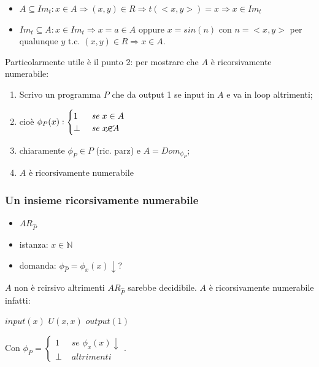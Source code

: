\documentclass{article}
\begin{document}
\begin{itemize}
	\item $A \subseteq Im_t: x \in A \Rightarrow (x,y) \in R \Rightarrow  t(<x,y>)=x \Rightarrow x \in Im_t$
	\item $Im_t \subseteq A:x \in Im_t \Rightarrow x=a \in A$ oppure $x=sin(n)$ con $n=<x,y>$ per qualunque $y$ t.c. $(x,y) \in R \Rightarrow x \in A$.
\end{itemize}




Particolarmente utile è il punto 2: per mostrare che $A$ è ricorsivamente numerabile:
\begin{enumerate}
	\item Scrivo un programma $P$ che da output 1 se input in $A$ e va in loop altrimenti;
	\item cioè $\phi_P(x):
		\begin{cases}
			1 &\textit{ se } x \in A\\
			\perp &\textit{ se } x \cancel{\in} A
		\end{cases}$
	\item chiaramente $\phi_P \in P$ (ric. parz) e $A=Dom_{\phi_P}$;
	\item $A$ è ricorsivamente numerabile
\end{enumerate}
   

\subsubsection{Un insieme ricorsivamente numerabile}
\begin{itemize}
	\item $AR_{\hat{P}}$
	\item istanza: $x \in \mathbb{N}$
	\item domanda: $\phi_{\hat{P}}=\phi_x(x)\downarrow$?
\end{itemize}
$A$ non è rcirsivo altrimenti $AR_{\hat{P}}$ sarebbe decidibile.
$A$ è ricorsivamente numerabile infatti:

\begin{algorithm}[h]
	\caption{$P \equiv$}
        \begin{algorithmic}[1]
        		 \State $input(x)$
        		 \State $U(x,x)$
        		 \State $output(1)$
        \end{algorithmic}
    \end{algorithm}
    
Con $\phi_P=\begin{cases}
			1 &\textit{ se } \phi_x(x)\downarrow \\
			\perp &\textit{ altrimenti} \end{cases}$.
			
\end{document}
